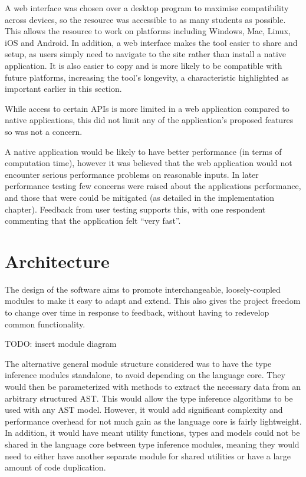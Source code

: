 \documentclass[a4paper,fleqn,oneside,12pt]{report}
\begin{document}
A web interface was chosen over a desktop program to maximise compatibility across devices, so the resource was accessible to as many students as possible. This allows the resource to work on platforms including Windows, Mac, Linux, iOS and Android. In addition, a web interface makes the tool easier to share and setup, as users simply need to navigate to the site rather than install a native application. It is also easier to copy and is more likely to be compatible with future platforms, increasing the tool’s longevity, a characteristic highlighted as important earlier in this section.

While access to certain APIs is more limited in a web application compared to native applications, this did not limit any of the application’s proposed features so was not a concern.

A native application would be likely to have better performance (in terms of computation time), however it was believed that the web application would not encounter serious performance problems on reasonable inputs. In later performance testing few concerns were raised about the applications performance, and those that were could be mitigated (as detailed in the implementation chapter). Feedback from user testing supports this, with one respondent commenting that the application felt “very fast”.

\section{Architecture}\label{id:h.l33hnjbawceh}

The design of the software aims to promote interchangeable, loosely-coupled modules to make it easy to adapt and extend. This also gives the project freedom to change over time in response to feedback, without having to redevelop common functionality.

TODO: insert module diagram

The alternative general module structure considered was to have the type inference modules standalone, to avoid depending on the language core. They would then be parameterized with methods to extract the necessary data from an arbitrary structured AST. This would allow the type inference algorithms to be used with any AST model. However, it would add significant complexity and performance overhead for not much gain as the language core is fairly lightweight. In addition, it would have meant utility functions, types and models could not be shared in the language core between type inference modules, meaning they would need to either have another separate module for shared utilities or have a large amount of code duplication.
\end{document}
